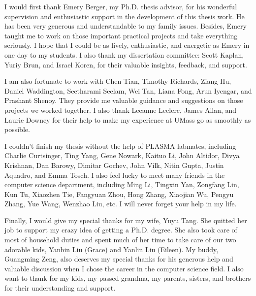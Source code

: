 I would first thank Emery Berger, my Ph.D. thesis advisor, for his wonderful supervision and enthusiastic support in the development of this thesis work. He has been very generous and understandable to my family issues. Besides, Emery taught me to work on those important practical projects and take everything seriously. I hope that I could be as lively, enthusiastic, and energetic as Emery in one day to my students.  I also thank my dissertation committee: Scott Kaplan, Yuriy Brun, and Israel Koren, for their valuable insights, feedback, and support. 

I am also fortunate to work with Chen Tian, Timothy Richards, Ziang Hu, Daniel Waddington, Seetharami Seelam, Wei Tan, Liana Fong, Arun Iyengar, and Prashant Shenoy. They provide me valuable guidance and suggestions on those projects we worked together. I also thank Leeanne Leclerc, James Allan, and Laurie Downey for their help to make my experience at UMass go as smoothly as possible. 

I couldn't finish my thesis without the help of PLASMA  labmates, including Charlie Curtsinger, Ting Yang, Gene Nowark, Kaituo Li, John Altidor, Divya Krishnan, Dan Barowy, Dimitar Gochev, John Vilk, Nitin Gupta, Justin Aquadro, and Emma Tosch. I also feel lucky to meet many friends in the computer science department, including Ming Li, Tingxin Yan, Zongfang Lin, Kun Tu, Xiaozhen Tie, Fangyuan Zhou, Hong Zhang, Xiaojian Wu, Pengyu Zhang, Yue Wang, Wenzhao Liu, etc. I will never forget your help in my life. 

Finally, I would give my special thanks for my wife, Yuyu Tang. She quitted her job to support my crazy idea of getting a Ph.D. degree. She also took care of most of household duties and spent much of her time to take care of our two adorable kids, Yanbin Liu (Grace) and Yanlin Liu (Eileen). My buddy, Guangming Zeng, also deserves my special thanks for his generous help and valuable discussion when I chose the career in the computer science field. I also want to thank for my kids, my passed grandma, my parents, sisters, and brothers for their understanding and support.    

